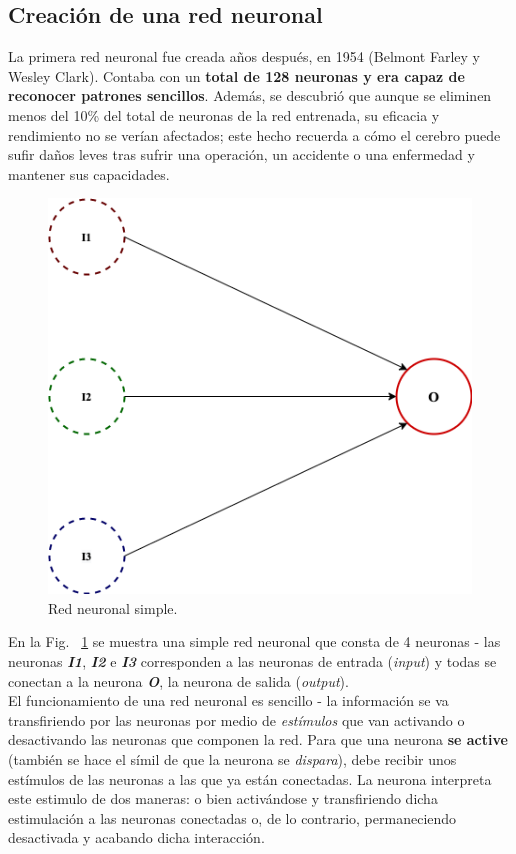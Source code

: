 \subsection{Creación de una red neuronal}

La primera red neuronal fue creada años después, en 1954 (Belmont Farley y Wesley Clark). Contaba con un \textbf{total de 128 neuronas y era capaz de reconocer patrones sencillos}. Además, se descubrió que aunque se eliminen menos del 10\% del total de neuronas de la red entrenada, su eficacia y rendimiento no se verían afectados; este hecho recuerda a cómo el cerebro puede sufir daños leves tras sufrir una operación, un accidente o una enfermedad y mantener sus capacidades. \\

\begin{figure}[h]
    \centering
    \includegraphics[scale=0.35]{cap2_contextualizacion/images/red_neuronal.png}
    \caption{Red neuronal simple.}
    \label{fig:red_neuronal_simple}
\end{figure}

En la Fig. ~\ref{fig:red_neuronal_simple} se muestra una simple red neuronal que consta de 4 neuronas - las neuronas \textbf{\textit{I1}}, \textbf{\textit{I2}} e \textbf{\textit{I3}} corresponden a las neuronas de entrada (\textit{input}) y todas se conectan a la neurona \textbf{\textit{O}}, la neurona de salida (\textit{output}). \\

El funcionamiento de una red neuronal es sencillo - la información se va transfiriendo por las neuronas por medio de \textit{estímulos} que van activando o desactivando las neuronas que componen la red. Para que una neurona \textbf{se active} (también se hace el símil de que la neurona se \textit{dispara}), debe recibir unos estímulos de las neuronas a las que ya están conectadas. La neurona interpreta este estimulo de dos maneras: o bien activándose y transfiriendo dicha estimulación a las neuronas conectadas o, de lo contrario, permaneciendo desactivada y acabando dicha interacción. 


